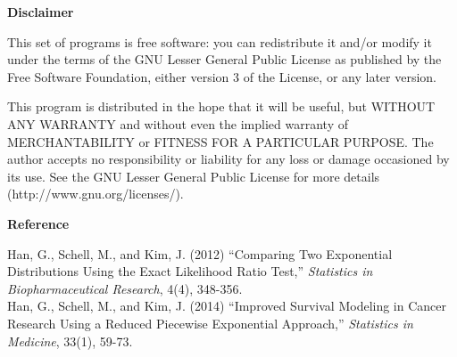 \documentclass[12pt] {article}
\begin{document}
\begin{center}
{\bf Disclaimer}
\end{center}
This set of programs is free software:
you can redistribute it and/or modify it
under the terms of the GNU Lesser General Public License as published by
the Free Software Foundation, either version 3 of the License, or any
later version.

This program is distributed in the hope that it will be useful, but
WITHOUT ANY WARRANTY and without even the implied warranty of
MERCHANTABILITY or FITNESS FOR A PARTICULAR PURPOSE.  The author
accepts no responsibility or liability for any loss or damage
occasioned by its use.  See the GNU Lesser General Public License for
more details (http://www.gnu.org/licenses/).



\begin{center}
  {\bf Reference}
\end{center}
\noindent
Han, G., Schell, M., and Kim, J. (2012) ``Comparing Two Exponential Distributions Using the Exact Likelihood Ratio Test,'' \textit{Statistics in Biopharmaceutical Research}, 4(4), 348-356.
\\

\noindent
Han, G., Schell, M., and Kim, J. (2014) ``Improved Survival Modeling in Cancer Research Using a Reduced Piecewise Exponential Approach,'' \textit{Statistics in Medicine}, 33(1), 59-73.
\end{document}
